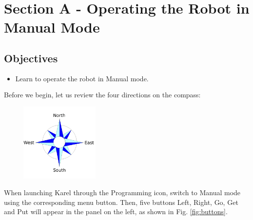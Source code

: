 
\section{Section A - Operating the Robot in Manual Mode} \label{sec:manual}

\subsection{Objectives} 
\begin{itemize}
\item Learn to operate the robot in Manual mode.
\end{itemize}
\noindent
Before we begin, let us review the four directions on the compass:\\[-7mm]

\begin{figure}[!ht]
\begin{center}
\includegraphics[width=0.35\textwidth]{imgk/compass.png}
\vspace{-0mm}
\end{center}
\vspace{-1cm}
\end{figure}
\newpage
\noindent
When launching Karel through the Programming icon, switch to Manual mode using the corresponding 
menu button. Then, five buttons Left, Right, Go, Get and Put will appear in the panel on the left,
as shown in Fig. \ref{fig:buttons}.


